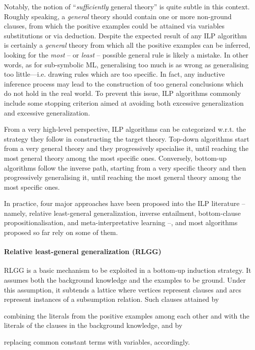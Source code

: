 \documentclass[12pt,a4paper,openright,twoside]{book}
\begin{document}
Notably, the notion of ``\emph{sufficiently} general theory'' is quite subtle in this context.
%
Roughly speaking, a \emph{general} theory should contain one or more non-ground clauses, from which the positive examples could be attained via variables substitutions or via deduction.
%
Despite the expected result of any ILP algorithm is certainly a \emph{general} theory from which all the positive examples can be inferred, looking for the \emph{most} -- or \emph{least} -- possible general rule is likely a mistake.
%
In other words, as for sub-symbolic ML, generalising too much is as wrong as generalising too little---i.e. drawing rules which are too specific.
%
In fact, any inductive inference process may lead to the construction of too general conclusions which do not hold in the real world.
%
To prevent this issue, ILP algorithms commonly include some stopping criterion aimed at avoiding both excessive generalization and excessive generalization.

From a very high-level perspective, ILP algorithms can be categorized w.r.t. the strategy they follow in constructing the target theory.
%
Top-down algorithms start from a very general theory and they progressively specialise it, until reaching the most general theory among the most specific ones.
%
Conversely, bottom-up algorithms follow the inverse path, starting from a very specific theory and then progressively generalising it, until reaching the most general theory among the most specific ones.

In practice, four major approaches have been proposed into the ILP literature -- namely, relative least-general generalization, inverse entailment, bottom-clause propositionalisation, and meta-interpretative learning --, and most algorithms proposed so far rely on some of them.

\paragraph{Relative least-general generalization (RLGG)}

RLGG \cite{Plotkin1971} is a basic mechanism to be exploited in a bottom-up induction strategy.
%
It assumes both the background knowledge and the examples to be ground.
%
Under this assumption, it subtends a lattice where vertices represent clauses and arcs represent instances of a subsumption relation.
%
Such clauses attained by
%
\begin{inlinelist}
    \item combining the literals from the positive examples among each other and with the literals of the clauses in the background knowledge, and by
    \item replacing common constant terms with variables, accordingly.
\end{inlinelist}
\end{document}

